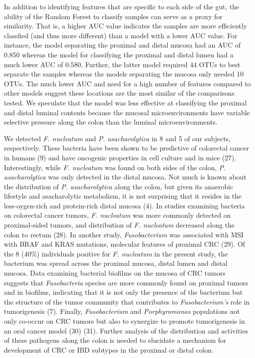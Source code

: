 \documentclass[12pt,]{article}
\begin{document}
In addition to identifying features that are specific to each side of
the gut, the ability of the Random Forest to classify samples can serve
as a proxy for similarity. That is, a higher AUC value indicates the
samples are more efficiently classfied (and thus more different) than a
model with a lower AUC value. For instance, the model separating the
proximal and distal mucosa had an AUC of 0.850 whereas the model for
classifying the proximal and distal lumen had a much lower AUC of 0.580.
Further, the latter model required 44 OTUs to best separate the samples
whereas the models separating the mucosa only needed 10 OTUs. The much
lower AUC and need for a high number of features compared to other
models suggest these locations are the most similar of the comparisons
tested. We speculate that the model was less effective at classifying
the proximal and distal luminal contents because the mucosal
microenvironments have variable selective pressure along the colon than
the luminal microenvironments.

We detected \emph{F. nucleatum} and \emph{P. asacharolytica} in 8 and 5
of our subjects, respectively. These bacteria have been shown to be
predictive of colorectal cancer in humans (9) and have oncogenic
properties in cell culture and in mice (27). Interestingly, while
\emph{F. nucleatum} was found on both sides of the colon, \emph{P.
asacharolytica} was only detected in the distal mucosa. Not much is
known about the distribution of \emph{P. asacharolytica} along the
colon, but given its anaerobic lifestyle and asacharolytic metabolism,
it is not surprising that it resides in the less-oygen-rich and
protein-rich distal mucosa (4). In studies examining bacteria on
colorectal cancer tumors, \emph{F. nucleatum} was more commonly detected
on proximal-sided tumors, and distribution of \emph{F. nucleatum}
decreased along the colon to rectum (28). In another study,
\emph{Fusobacterium} was associated with MSI with BRAF and KRAS
mutations, molecular features of proximal CRC (29). Of the 8 (40\%)
individuals positive for \emph{F. nucleatum} in the present study, the
bacterium was spread across the proximal mucosa, distal lumen and distal
mucosa. Data examining bacterial biofilms on the mucosa of CRC tumors
suggests that \emph{Fusobacteria} species are more commonly found on
proximal tumors and in biofilms, indicating that it is not only the
presence of the bacterium but the structure of the tumor community that
contributes to \emph{Fusobacterium's} role in tumorigenesis (7).
Finally, \emph{Fusobacterium} and \emph{Porphyromonas} populations not
only co-occur on CRC tumors but also to synergize to promote
tumorigenesis in an oral cancer model (30) (31). Further analysis of the
distribution and activities of these pathogens along the colon is needed
to elucidate a mechanism for development of CRC or IBD subtypes in the
proximal or distal colon.
\end{document}
